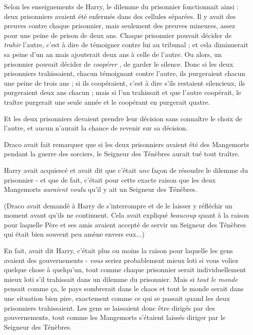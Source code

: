 Selon les enseignements de Harry, le dilemme du prisonnier fonctionnait ainsi : deux prisonniers avaient été enfermés dans des cellules séparées. Il y avait des preuves contre chaque prisonnier, mais seulement des preuves mineures, assez pour une peine de prison de deux ans. Chaque prisonnier pouvait décider de \emph{trahir}  l'autre, c'est à dire de témoigner contre lui au tribunal ; et cela diminuerait sa peine d'un an mais ajouterait deux ans à celle de l'autre. Ou alors, un prisonnier pouvait décider de \emph{coopérer} , de garder le silence. Donc si les deux prisonniers trahissaient, chacun témoignant contre l'autre, ils purgeraient chacun une peine de trois ans ; si ils coopéraient, c'est à dire s'ils restaient silencieux, ils purgeraient deux ans chacun ; mais si l'un trahissait et que l'autre coopérait, le traître purgerait une seule année et le coopérant en purgerait quatre.

Et les deux prisonniers devaient prendre leur décision sans connaître le choix de l'autre, et aucun n'aurait la chance de revenir sur sa décision.

Draco avait fait remarquer que si les deux prisonniers avaient été des Mangemorts pendant la guerre des sorciers, le Seigneur des Ténèbres aurait tué tout traître.

Harry avait acquiescé et avait dit que c'était \emph{une}  façon de résoudre le dilemme du prisonnier - et que de fait, c'était pour cette exacte raison que les deux Mangemorts \emph{auraient voulu } qu'il y ait un Seigneur des Ténèbres.

(Draco avait demandé à Harry de s'interrompre et de le laisser y réfléchir un moment avant qu'ils ne continuent. Cela avait expliqué \emph{beaucoup}  quant à la raison pour laquelle Père et ses amis avaient accepté de servir un Seigneur des Ténèbres qui était bien souvent peu amène envers eux...)

En fait, avait dit Harry, c'était plus ou moins la raison pour laquelle les gens avaient des gouvernements - \emph{vous}  seriez probablement mieux loti si vous voliez quelque chose à quelqu'un, tout comme chaque prisonnier serait individuellement mieux loti s'il trahissait dans un dilemme du prisonnier. Mais si \emph{tout le monde}  pensait comme ça, le pays sombrerait dans le chaos et tout le monde serait dans une situation bien pire, exactement comme ce qui se passait quand les deux prisonniers trahissaient. Les gens se laissaient donc être dirigés par des gouvernements, tout comme les Mangemorts s'étaient laissés diriger par le Seigneur des Ténèbres.

